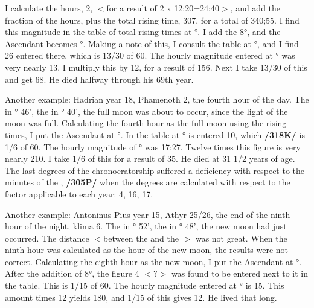 I calculate the hours, 2, $<$for a result of 2 x 12;20=24;40$>$, and add the fraction of the hours, plus the total rising time, 307, for a total of 340;55. I find this magnitude in the table of total rising times at \Aquarius\xspace 29°. I add the 8°, and the Ascendant becomes \Pisces\xspace 7°. Making a note of this, I consult the table at \Pisces\xspace 7°, and I find 26 entered there, which is 13/30 of 60. The hourly magnitude entered at \Aquarius\xspace 29° was very nearly 13. I multiply this by 12, for a result of 156. Next I take 13/30 of this and get 68. He died halfway through his 69th year.

Another example: Hadrian year 18, Phamenoth 2, the fourth hour of the day. The \Sun\xspace in \Pisces\xspace 9° 46', the \Moon\xspace in \Virgo\xspace 9° 40', the full moon was about to occur, since the light of the moon was full. Calculating the fourth hour as the full moon using the rising times, I put the Ascendant at \Taurus\xspace 29°. In
the table at \Taurus\xspace 29° is entered 10, which \textbf{/318K/} is 1/6 of 60. The hourly magnitude of \Taurus\xspace 29° was 17;27. Twelve times this figure is very nearly 210. I take 1/6 of this for a result of 35. He died at 31 1/2 years of age. The last degrees of the chronocratorship suffered a deficiency with respect to the minutes of the \Sun, \textbf{/305P/} when the degrees are calculated with respect to the factor applicable to each year: 4, 16, 17.

Another example: Antoninus Pius year 15, Athyr 25/26, the end of the ninth hour of the night, klima 6. The \Sun\xspace in \Sagittarius\xspace 2° 52', the \Moon\xspace in \Sagittarius\xspace 6° 48', the new moon had just occurred. The distance $<$between the \Moon\xspace and the \Sun$>$ was not great. When the ninth hour was calculated as the hour of the new moon, the results were not correct. Calculating the eighth hour as the new moon, I put the Ascendant at \Leo\xspace 12°. After the addition of 8°, the figure 4 $<$?$>$ was found to be entered next to it in the table. This is 1/15 of 60. The hourly magnitude entered at \Libra\xspace 20° is 15. This amount times 12 yields 180, and 1/15 of this gives 12. He lived that long.
\newpage